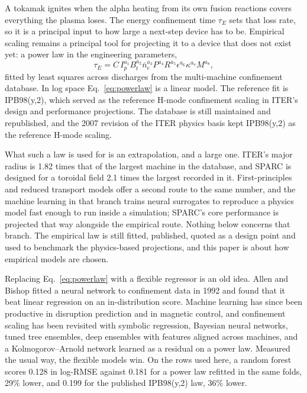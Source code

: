 \documentclass[aip,pop,preprint,amsmath,amssymb]{revtex4-2}
\begin{document}
A tokamak ignites when the alpha heating from its own fusion reactions covers
everything the plasma loses. The energy confinement time $\tau_E$ sets that
loss rate, so it is a principal input to how large a next-step device has to
be. Empirical scaling remains a principal tool for projecting it to a device
that does not exist yet\cite{ipb98}: a power law in the engineering parameters,
\begin{equation}
\tau_E = C\, I_p^{a_1} B_t^{a_2} \bar{n}_e^{a_3} P^{a_4} R^{a_5}
         \epsilon^{a_6} \kappa^{a_7} M^{a_8},
\label{eq:powerlaw}
\end{equation}
fitted by least squares across discharges from the multi-machine confinement
database. In log space Eq.~\eqref{eq:powerlaw} is a linear model. The
reference fit is IPB98(y,2)\cite{ipb98}, which served as the reference
H-mode confinement scaling in ITER's design and performance projections. The database is still maintained and republished\cite{hdb5}, and the 2007
revision of the ITER physics basis kept IPB98(y,2) as the reference H-mode
scaling\cite{doyle07}.

What such a law is used for is an extrapolation, and a large one. ITER's major
radius is 1.82 times that of the largest machine in the database, and
SPARC\cite{creely} is designed for a toroidal field 2.1 times the largest
recorded in it. First-principles and reduced transport models offer a second
route to the same number, and the machine learning in that branch trains
neural surrogates to reproduce a physics model fast enough to run inside a
simulation\cite{citrin,meneghini}; SPARC's core performance is projected that
way\cite{sparccore} alongside the empirical route. Nothing below concerns that
branch. The empirical law is still fitted, published, quoted as a design point
and used to benchmark the physics-based projections, and this paper is about
how empirical models are chosen.

Replacing Eq.~\eqref{eq:powerlaw} with a flexible regressor is an old idea.
Allen and Bishop\cite{allen} fitted a neural network to confinement data in
1992 and found that it beat linear regression on an in-distribution score.
Machine learning has since been productive in disruption
prediction\cite{katesharbeck,rea,zhu} and in magnetic control\cite{degrave},
and confinement scaling has been revisited with symbolic
regression\cite{murari}, Bayesian neural networks\cite{gao}, tuned tree
ensembles\cite{xiong}, deep ensembles with features aligned across
machines\cite{namseo}, and a Kolmogorov--Arnold network learned as a residual
on a power law\cite{wang}. Measured the usual way, the flexible models win. On
the rows used here, a random forest scores 0.128 in log-RMSE against 0.181 for
a power law refitted in the same folds, 29\% lower, and 0.199 for the
published IPB98(y,2) law, 36\% lower.
\end{document}
